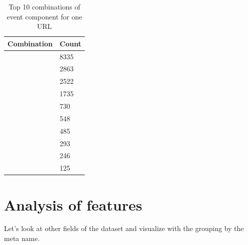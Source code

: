 \begin{table}
\begin{center}
{\renewcommand{\arraystretch}{1.5}
\begin{tabular}{| p{8cm} | p{2cm}|}
\hline
\textbf{Combination}	&	\textbf{Count}\\
\hline
['name']	&	8335\\
\hline
['location', 'name']	&	2863\\
\hline
['name', 'startDate']	&	2522\\
\hline
['location', 'name', 'startDate']	&	1735\\
\hline
['description', 'name']	&	730\\
\hline
['description', 'name', 'startDate']	&	548\\
\hline
['description', 'location', 'name']	&	485\\
\hline
['description', 'location', 'name', 'startDate']	&	293\\
\hline
['name', 'startDate', 'startDate']	&	246\\
\hline
['location', 'name', 'startDate', 'startDate']	&	125\\
\hline
\end{tabular}}
\caption{Top 10 combinations of event component for one URL}
\label{table:top10comb}
\end{center}
\end{table}	

\section{Analysis of features}
Let's look at other fields of the dataset and visualize with the grouping by the meta name.    

